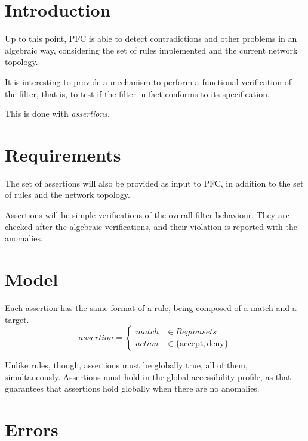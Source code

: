 


\section{Introduction}

Up to this point, PFC is able to detect contradictions and other
problems in an algebraic way, considering the set of rules implemented and the
current network topology.

It is interesting to provide a mechanism to perform a
functional verification of the filter, that is, to test if the filter in fact
conforms to its specification.

This is done with \emph{assertions}.



\section{Requirements}

The set of assertions will also be provided as input to PFC, in addition to the
set of rules and the network topology.

Assertions will be simple verifications of the overall filter behaviour. They
are checked after the algebraic verifications, and their violation is reported with
the anomalies.



\section{Model}

Each assertion has the same format of a rule, being composed of a match and a
target.
\begin{equation*}
	assertion =
	\begin{cases}
		match & \in Regionsets \\
		action & \in \{ \mbox{accept}, \mbox{deny} \}
	\end{cases}
\end{equation*}

Unlike rules, though, assertions must be globally true, all of them,
simultaneously. Assertions must hold in the global accessibility profile,
as that guarantees that assertions hold globally when there are no anomalies.



\section{Errors}

